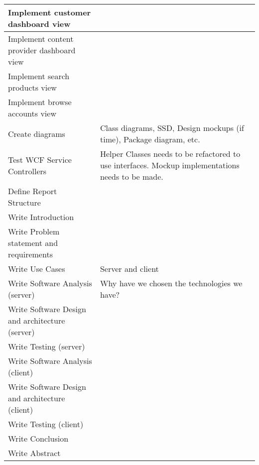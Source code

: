 \begin{longtable}{|p{200px}|p{200px}|}
	Implement customer dashboard view & ~  \\ \hline
	Implement content provider dashboard view & ~  \\ \hline
	Implement search products view & ~  \\ \hline
	Implement browse accounts view & ~  \\ \hline
	Create diagrams & Class diagrams, SSD, Design mockups (if time), Package diagram, etc. \\ \hline
	Test WCF Service Controllers & Helper Classes needs to be refactored to use interfaces. Mockup implementations needs to be made. \\ \hline
	Define Report Structure & ~  \\ \hline
	Write Introduction & ~  \\ \hline
	Write Problem statement and requirements & ~  \\ \hline
	Write Use Cases & Server and client  \\ \hline
	Write Software Analysis (server) & Why have we chosen the technologies we have? \\ \hline
	Write Software Design and architecture (server) & ~  \\ \hline
	Write Testing (server) & ~  \\ \hline
	Write Software Analysis (client) & ~  \\ \hline
	Write Software Design and architecture (client) & ~  \\ \hline
	Write Testing (client) & ~  \\ \hline
	Write Conclusion & ~  \\ \hline
	Write Abstract & ~  \\ \hline
\end{longtable}

\newpage
\renewcommand{\section}[2]{} %